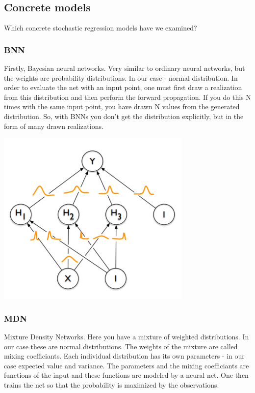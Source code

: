 \documentclass[margin=0.01in]{article}
\begin{document}
\subsection{Concrete models}
\label{sec:org5f18671}
Which concrete stochastic regression models have we examined?

\subsubsection{BNN}
\label{sec:org8b1fa3d}
Firstly, Bayesian neural networks. Very similar to ordinary neural networks, but the weights are probability distributions. In our case - normal distribution. In order to evaluate the net with an input point, one must first draw a realization from this distribution and then perform the forward propagation. If you do this N times with the same input point, you have drawn N values from the generated distribution. So, with BNNs you don't get the distribution explicitly, but in the form of many drawn realizations.
\begin{center}
\includegraphics[width=.9\linewidth]{../images/bnn.png}
\end{center}

\subsubsection{MDN}
\label{sec:org4294bec}
Mixture Density Networks. Here you have a mixture of weighted distributions. In our case these are normal distributions. The weights of the mixture are called mixing coefficiants. Each individual distribution has its own parameters - in our case expected value and variance. The parameters and the mixing coefficiants are functions of the input and these functions are modeled by a neural net. One then trains the net so that the probability is maximized by the observations.
\end{document}
